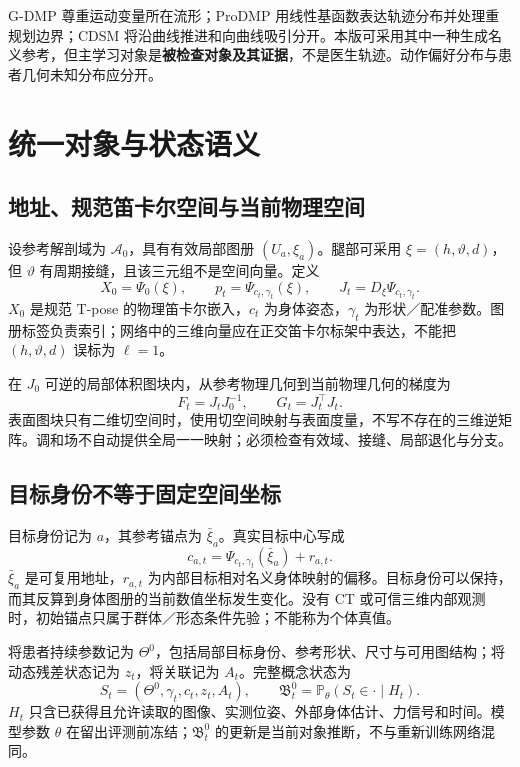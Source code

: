 \documentclass[UTF8,fontset=fandol,11pt,a4paper]{ctexart}
\theoremstyle{plain}
\theoremstyle{definition}
\theoremstyle{remark}
\numberwithin{equation}{section}
\newcommand{\Prb}{\mathbb P}
\newcommand{\B}{\mathfrak B}
\newcommand{\cA}{\mathcal A}
\begin{document}
G-DMP 尊重运动变量所在流形；ProDMP 用线性基函数表达轨迹分布并处理重规划边界；CDSM 将沿曲线推进和向曲线吸引分开\cite{gdmp,prodmp,cdsm}。本版可采用其中一种生成名义参考，但主学习对象是\textbf{被检查对象及其证据}，不是医生轨迹。动作偏好分布与患者几何未知分布应分开。

\section{统一对象与状态语义}
\label{sec:state}
\subsection{地址、规范笛卡尔空间与当前物理空间}
设参考解剖域为 $\cA_0$，具有有效局部图册 $(U_a,\xi_a)$。腿部可采用 $\xi=(h,\vartheta,d)$，但 $\vartheta$ 有周期接缝，且该三元组不是空间向量。定义
\begin{equation}
 X_0=\Psi_0(\xi),\qquad p_t=\Psi_{c_t,\gamma_t}(\xi),\qquad
 J_t=D_\xi\Psi_{c_t,\gamma_t}.
 \label{eq:maps}
\end{equation}
$X_0$ 是规范 T-pose 的物理笛卡尔嵌入，$c_t$ 为身体姿态，$\gamma_t$ 为形状／配准参数。图册标签负责索引；网络中的三维向量应在正交笛卡尔标架中表达，不能把 $(h,\vartheta,d)$ 误标为 $\ell=1$。

在 $J_0$ 可逆的局部体积图块内，从参考物理几何到当前物理几何的梯度为
\begin{equation}
 F_t=J_tJ_0^{-1},\qquad G_t=J_t^\top J_t.
 \label{eq:F}
\end{equation}
表面图块只有二维切空间时，使用切空间映射与表面度量，不写不存在的三维逆矩阵。调和场不自动提供全局一一映射；必须检查有效域、接缝、局部退化与分支。

\subsection{目标身份不等于固定空间坐标}
目标身份记为 $a$，其参考锚点为 $\bar\xi_a$。真实目标中心写成
\begin{equation}
 \boxed{c_{a,t}=\Psi_{c_t,\gamma_t}(\bar\xi_a)+r_{a,t}.}
 \label{eq:residual}
\end{equation}
$\bar\xi_a$ 是可复用地址，$r_{a,t}$ 为内部目标相对名义身体映射的偏移。目标身份可以保持，而其反算到身体图册的当前数值坐标发生变化。没有 CT 或可信三维内部观测时，初始锚点只属于群体／形态条件先验；不能称为个体真值。

将患者持续参数记为 $\Theta^0$，包括局部目标身份、参考形状、尺寸与可用图结构；将动态残差状态记为 $z_t$，将关联记为 $A_t$。完整概念状态为
\begin{equation}
 S_t=(\Theta^0,\gamma_t,c_t,z_t,A_t),\qquad
 \B_t^0=\Prb_\theta(S_t\in\cdot\mid H_t).
 \label{eq:belief}
\end{equation}
$H_t$ 只含已获得且允许读取的图像、实测位姿、外部身体估计、力信号和时间。模型参数 $\theta$ 在留出评测前冻结；$\B_t^0$ 的更新是当前对象推断，不与重新训练网络混同。
\end{document}
